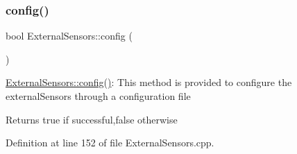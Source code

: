 \subsubsection{\texorpdfstring{config()}{config()}\hspace{0.1cm}{\footnotesize\ttfamily [1/2]}}
{\footnotesize\ttfamily bool External\+Sensors\+::config (\begin{DoxyParamCaption}{ }\end{DoxyParamCaption})}

\hyperlink{class_external_sensors_a862a4bd11346b37270d0244c2adabe5a}{External\+Sensors\+::config()}\+: This method is provided to configure the external\+Sensors through a configuration file

\begin{DoxyReturn}{Returns}
true if successful,false otherwise 
\end{DoxyReturn}


Definition at line 152 of file External\+Sensors.\+cpp.


